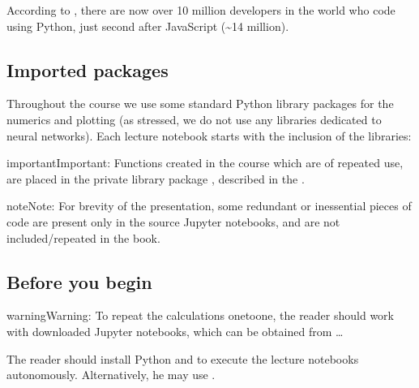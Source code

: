 \documentclass[letterpaper,10pt,english]{jupyterBook}
\begin{document}
\sphinxAtStartPar
According to , there are now over 10 million developers in the world who code using Python, just second after JavaScript (\textasciitilde{}14 million).


\subsection{Imported packages}
\label{\detokenize{docs/intro:imported-packages}}
\sphinxAtStartPar
Throughout the course we use some standard Python library packages for the numerics and plotting (as stressed, we do not use any libraries dedicated to neural networks). Each lecture notebook starts with the inclusion of the libraries:

\begin{sphinxVerbatim}[commandchars=\\\{\}]
   

   

     
\end{sphinxVerbatim}

\begin{sphinxadmonition}{important}{Important:}
\sphinxAtStartPar
Functions created in the course which are of repeated use, are placed in the private library package , described in the {\hyperref[\detokenize{docs/lib_app:app-lab}]{}}.
\end{sphinxadmonition}

\begin{sphinxadmonition}{note}{Note:}
\sphinxAtStartPar
For brevity of the presentation, some redundant or inessential pieces of code are present only in the source Jupyter notebooks, and are not included/repeated in the book.
\end{sphinxadmonition}


\subsection{Before you begin}
\label{\detokenize{docs/intro:before-you-begin}}
\begin{sphinxadmonition}{warning}{Warning:}
\sphinxAtStartPar
To repeat the calculations one\sphinxhyphen{}to\sphinxhyphen{}one, the reader should work with downloaded Jupyter notebooks, which can be obtained from …

\sphinxAtStartPar
The reader should install Python and 
to execute the lecture notebooks autonomously. Alternatively, he may use .
\end{sphinxadmonition}
\end{document}
